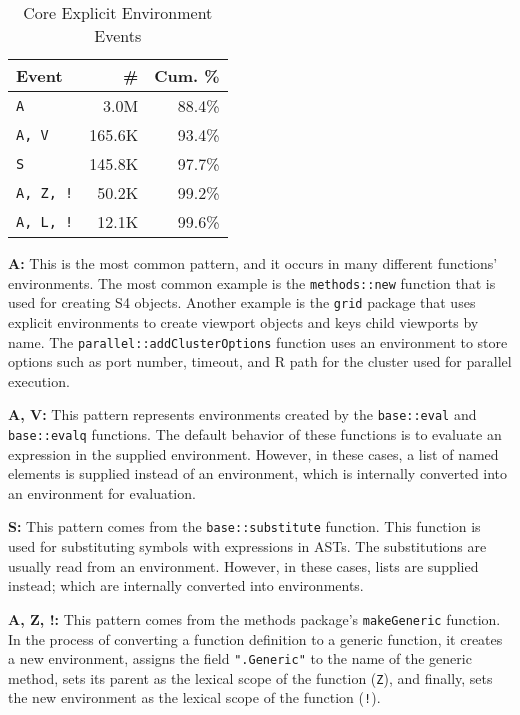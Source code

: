 \documentclass[10pt,review,sigplan,anonymous=true,authorversion=true,nonacm=true]{acmart}
\newcommand{\code}[1]{\lstinline |#1|\xspace}
\begin{document}
\begin{table}[!h]
  \small
  \caption{Core Explicit Environment Events} \label{table:core_explicit_env_seq}
  \centering
  \begin{tabular}{lrr}
    \toprule
    \textbf{Event}&\textbf{\#}&\textbf{Cum. \%}\\
    \midrule
    \texttt{A}&3.0M&88.4\%\\
    \texttt{A, V}&165.6K&93.4\%\\
    \texttt{S}&145.8K&97.7\%\\
    \texttt{A, Z, !}&50.2K&99.2\%\\
    \texttt{A, L, !}&12.1K&99.6\%\\
    \bottomrule
  \end{tabular}
\end{table}

\noindent
\textbf{A:} This is the most common pattern, and it occurs in many different
functions' environments. The most common example is the \code{methods::new}
function that is used for creating S4 objects. Another example is the
\code{grid} package that uses explicit environments to create viewport objects
and keys child viewports by name. The \code{parallel::addClusterOptions} function
uses an environment to store options such as port number, timeout, and R path
for the cluster used for parallel execution.

\noindent
\textbf{A, V:} This pattern represents environments created by the
\code{base::eval} and \code{base::evalq} functions. The default behavior of
these functions is to evaluate an expression in the supplied environment.
However, in these cases, a list of named elements is supplied instead of an
environment, which is internally converted into an environment for evaluation.

\noindent
\textbf{S:} This pattern comes from the \code{base::substitute} function. This
function is used for substituting symbols with expressions in ASTs. The
substitutions are usually read from an environment. However, in these cases,
lists are supplied instead; which are internally converted into environments.

\noindent
\textbf{A, Z, !:} This pattern comes from the methods package's
\code{makeGeneric} function. In the process of converting a function definition
to a generic function, it creates a new environment, assigns the field
\code{".Generic"} to the name of the generic method, sets its parent as the
lexical scope of the function (\texttt{Z}), and finally, sets the new
environment as the lexical scope of the function (\texttt{!}).
\end{document}
